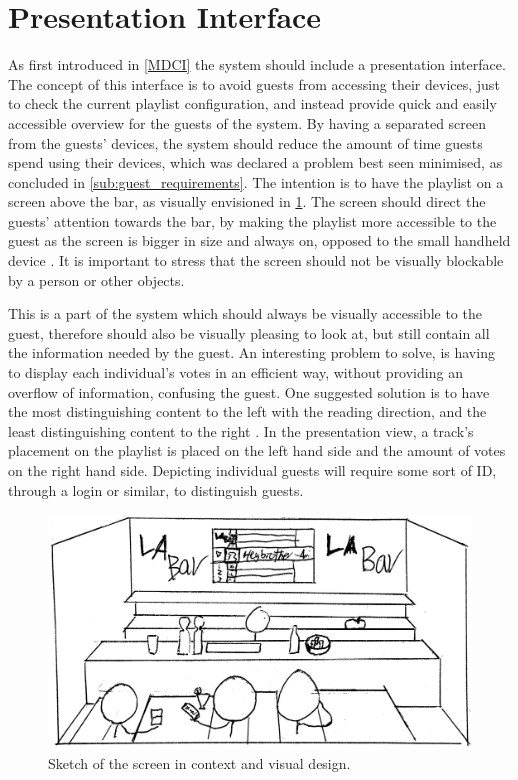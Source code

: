 \section{Presentation Interface}
As first introduced in \cref{MDCI} the system should include a presentation interface. The concept of this interface is to avoid guests from accessing their devices, just to check the current playlist configuration, and instead provide quick and easily accessible overview for the guests of the system. By having a separated screen from the guests' devices, the system should reduce the amount of time guests spend using their devices, which was declared a problem best seen minimised, as concluded in \cref{sub:guest_requirements}. The intention is to have the playlist on a screen above the bar, as visually envisioned in \cref{fig:PresentationInterface}. The screen should direct the guests' attention towards the bar, by making the playlist more accessible to the guest as the screen is bigger in size and always on, opposed to the small handheld device \cite{DEB}. It is important to stress that the screen should not be visually blockable by a person or other objects.

This is a part of the system which should always be visually accessible to the guest, therefore should also be visually pleasing to look at, but still contain all the information needed by the guest. An interesting problem to solve, is having to display each individual's votes in an efficient way, without providing an overflow of information, confusing the guest. One suggested solution is to have the most distinguishing content to the left with the reading direction, and the least distinguishing content to the right \cite{material}. In the presentation view, a track's placement on the playlist is placed on the left hand side and the amount of votes on the right hand side. Depicting individual guests will require some sort of ID, through a login or similar, to distinguish guests.

\begin{figure}[hbtp]
  \centering
  \includegraphics[width=1.0\linewidth]{Images/presentation.png}
  \caption{Sketch of the screen in context and visual design.}\label{fig:PresentationInterface}
\end{figure}

